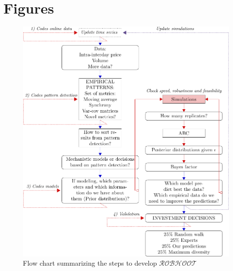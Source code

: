 \documentclass[english,12pt]{article}
\begin{document}
\newpage

\section{Figures}



\begin{figure}
\vspace{-1 in}
\begin{center}
\includegraphics[scale=0.8]{EasyFlowChart.pdf}
\end{center}
\caption{Flow chart summarizing the steps to develop $\mathcal{ROBHOOT}$}
\end{figure}
\newpage
\end{document}
